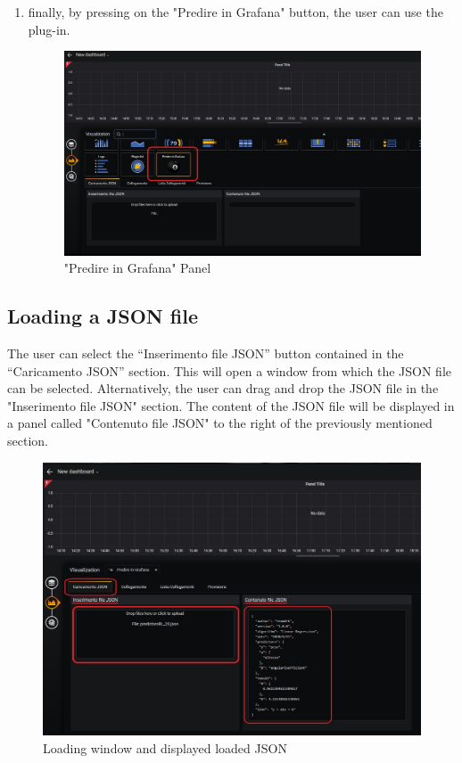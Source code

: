 \begin{enumerate}
	\item finally, by pressing on the "Predire in Grafana" button, the user can use the plug-in.
	
\begin{figure}[H]
\centering
\includegraphics[scale=0.55]{img/plug-in/selection_ball.png}
\caption{"Predire in Grafana" Panel}
\end{figure}

\end{enumerate}

	
\subsection{Loading a JSON file}
The user can select the “Inserimento file JSON” button contained in the “Caricamento JSON” section.
This will open a window from which the JSON file can be selected.
Alternatively, the user can drag and drop the JSON file in the "Inserimento file JSON" section.
The content of the JSON file will be displayed in a panel called "Contenuto file JSON" to the right of the previously mentioned section.

\begin{figure}[H]
\centering
\includegraphics[scale=0.60]{img/plug-in/loading_js.png}
\caption{Loading window and displayed loaded JSON}
\end{figure}


